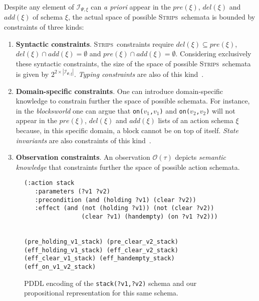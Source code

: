 \documentclass{article}
\newcommand{\strips}{\textsc{Strips}}
\begin{document}
Despite any element of ${\mathcal I}_{\Psi,\xi}$ can {\em a priori} appear in the $pre(\xi)$, $del(\xi)$ and $add(\xi)$ of schema $\xi$, the actual space of possible \strips\ schemata is bounded by constraints of three kinds:
\begin{enumerate}
\item {\bf Syntactic constraints}. \strips\ constraints require $del(\xi)\subseteq pre(\xi)$, $del(\xi)\cap add(\xi)=\emptyset$ and $pre(\xi)\cap add(\xi)=\emptyset$. Considering exclusively these syntactic constraints, the size of the space of possible \strips\ schemata is given by $2^{2\times|{\mathcal I}_{\Psi,\xi}|}$. {\em Typing constraints} are also of this kind~\cite{mcdermott1998pddl}. 
\item {\bf Domain-specific constraints}. One can introduce domain-specific knowledge to constrain further the space of possible schemata. For instance, in the {\em blocksworld} one can argue that {\small\tt on($v_1$,$v_1$)} and {\small\tt on($v_2$,$v_2$)} will not appear in the $pre(\xi)$, $del(\xi)$ and $add(\xi)$ lists of an action schema $\xi$ because, in this specific domain, a block cannot be on top of itself. {\it State invariants} are also constraints of this kind~\cite{fox1998automatic}. 
\item {\bf Observation constraints}. An observation $\mathcal{O}(\tau)$ depicts {\em semantic knowledge} that constraints further the space of possible action schemata.   
\end{enumerate}

\begin{figure}
  \begin{tiny}  
  \begin{verbatim}
(:action stack
   :parameters (?v1 ?v2)
   :precondition (and (holding ?v1) (clear ?v2))
   :effect (and (not (holding ?v1)) (not (clear ?v2))
                (clear ?v1) (handempty) (on ?v1 ?v2)))


(pre_holding_v1_stack) (pre_clear_v2_stack)
(eff_holding_v1_stack) (eff_clear_v2_stack)
(eff_clear_v1_stack) (eff_handempty_stack) (eff_on_v1_v2_stack)
  \end{verbatim}           
  \end{tiny}  
 \caption{\small PDDL encoding of the {\tt\small stack(?v1,?v2)} schema and our propositional representation for this same schema.}
\label{fig:propositional}
\end{figure}
\end{document}
